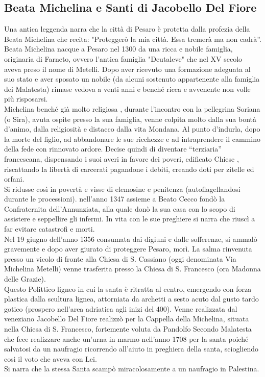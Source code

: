 \documentclass[12pt,a4paper]{article}
\begin{document}
	\subsection{Beata Michelina e Santi di Jacobello Del Fiore}
	Una antica leggenda narra che la città di Pesaro è protetta dalla profezia della Beata Michelina che recita: "Proteggerò la mia città. Essa tremerà ma non cadrà”.\\
	Beata Michelina nacque a Pesaro nel 1300 da una ricca e nobile famiglia, originaria di Farneto, ovvero l’antica famiglia "Deutaleve" che nel XV secolo aveva preso il nome di Metelli. Dopo aver ricevuto una formazione adeguata al suo stato e aver sposato un nobile (da alcuni sostenuto appartenente alla famiglia dei Malatesta) rimase vedova a venti anni e benché ricca e avvenente non volle più risposarsi.\\
	Michelina benché già molto religiosa , durante l'incontro con la  pellegrina Soriana (o Sira), avuta ospite presso la sua famiglia, venne colpita molto dalla sua bontà d'animo, dalla religiosità e distacco dalla vita Mondana. Al punto d'indurla, dopo la morte del figlio, ad abbandonare le sue ricchezze e ad intraprendere il cammino della fede con rinnovato ardore. Decise quindi di diventare “terziaria” francescana, dispensando i suoi averi in favore dei poveri, edificato Chiese , riscattando la libertà di carcerati pagandone i debiti, creando doti per zitelle ed orfani.\\
	Si ridusse così in povertà e visse di elemosine e penitenza (autoflagellandosi durante le processioni). nell'anno 1347 assieme a Beato Cecco fondò la Confraternita dell'Annunziata, alla quale donò la sua casa con lo scopo di assistere e seppellire gli infermi. In vita con le sue preghiere si narra che riuscì a far evitare catastrofi e morti.\\
	Nel 19 giugno dell'anno 1356 consumata dai digiuni e dalle sofferenze, si ammalò gravemente e dopo aver giurato di proteggere Pesaro, morì. La salma rinvenuta presso un vicolo di fronte alla Chiesa di S. Cassiano (oggi denominata Via Michelina Metelli) venne trasferita presso la Chiesa di S. Francesco (ora Madonna delle Grazie).\\
	Questo Polittico ligneo in cui la santa è ritratta al centro, emergendo con forza plastica dalla scultura lignea, attorniata da archetti a sesto acuto dal gusto tardo gotico (prospero nell'area adriatica agli inizi del 400). Venne realizzata dal veneziano Jacobello Del Fiore realizzò per la Cappella della Michelina, situata nella Chiesa di S. Francesco, fortemente voluta da Pandolfo Secondo Malatesta che fece realizzare anche un'urna in marmo nell'anno 1708 per la santa poiché salvatosi da un naufragio ricorrendo all'aiuto in preghiera della santa, sciogliendo così il voto che aveva con Lei.\\
	Si narra che la stessa Santa scampò miracolosamente a un naufragio in Palestina.
	
\end{document}
